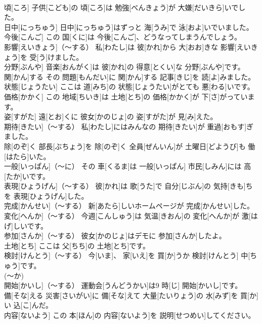 \documentclass[8pt]{extreport}
\begin{document}
\begin{CJK}{UTF8}{min}
\\	頃[ころ]	子供[こども]の 頃[ころ]は 勉強[べんきょう]が 大嫌[だいきら]いでした。		
\\	日中[にっちゅう]	日中[にっちゅう]はずっと 海[うみ]で 泳[およ]いでいました。		
\\	今後[こんご]	この 国[くに]は 今後[こんご]、どうなってしまうんでしょう。		
\\	影響[えいきょう]（～する）	私[わたし]は 彼[かれ]から 大[おお]きな 影響[えいきょう]を 受[う]けました。		
\\	分野[ぶんや]	音楽[おんがく]は 彼[かれ]の 得意[とくい]な 分野[ぶんや]です。		
\\	関[かん]する	その 問題[もんだい]に 関[かん]する 記事[きじ]を 読[よ]みました。		
\\	状態[じょうたい]	ここは 道[みち]の 状態[じょうたい]がとても 悪[わる]いです。		
\\	価格[かかく]	この 地域[ちいき]は 土地[とち]の 価格[かかく]が 下[さ]がっています。		
\\	姿[すがた]	遠[とお]くに 彼女[かのじょ]の 姿[すがた]が 見[み]えた。		
\\	期待[きたい]（～する）	私[わたし]にはみんなの 期待[きたい]が 重過[おもす]ぎました。		
\\	除[のぞ]く	部長[ぶちょう]を 除[のぞ]く 全員[ぜんいん]が 土曜日[どようび]も 働[はたら]いた。		
\\	一般[いっぱん]（～に）	その 車[くるま]は 一般[いっぱん] 市民[しみん]には 高[たか]いです。		
\\	表現[ひょうげん]（～する）	彼[かれ]は 歌[うた]で 自分[じぶん]の 気持[きも]ちを 表現[ひょうげん]した。		
\\	完成[かんせい]（～する）	新[あたら]しいホームページが 完成[かんせい]した。		
\\	変化[へんか]（～する）	今週[こんしゅう]は 気温[きおん]の 変化[へんか]が 激[はげ]しいです。		
\\	参加[さんか]（～する）	彼女[かのじょ]はデモに 参加[さんか]したよ。		
\\	土地[とち]	ここは 父[ちち]の 土地[とち]です。		
\\	検討[けんとう]（～する）	今[いま]、 家[いえ]を 買[か]うか 検討[けんとう] 中[ちゅう]です。		
\\	(～か) 
\\	開始[かいし]（～する）	運動会[うんどうかい]は9 時[じ] 開始[かいし]です。		
\\	備[そな]える	災害[さいがい]に 備[そな]えて 大量[たいりょう]の 水[みず]を 買[か]い 込[こ]んだ。		
\\	内容[ないよう]	この 本[ほん]の 内容[ないよう]を 説明[せつめい]してください。		

\end{CJK}
\end{document}
